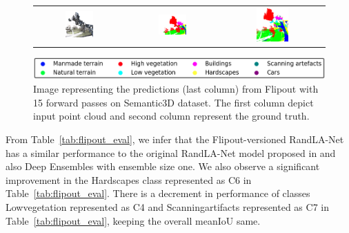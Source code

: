 \begin{figure}[h!]
\begin{tabular}{ccc}
            \includegraphics[width=0.33\textwidth, height=0.18\textheight]{images/seg_output/sem3d_seg_output/3_RGB.pdf} &
            \includegraphics[width=0.33\textwidth, height=0.18\textheight]{images/seg_output/sem3d_seg_output/3_GT.pdf}& 
            \includegraphics[width=0.33\textwidth, height=0.18\textheight]{images/seg_output/flipout/sem3d_3.pdf}\\
        \end{tabular}
        \includegraphics[scale=0.45]{images/legend.png}
        \caption{Image representing the predictions (last column) from Flipout with 15 forward passes on Semantic3D dataset.
        The first column depict input point cloud and second column represent the ground truth.}
        \label{fig:flipout_vis_sem3d}
    \end{figure}   

    From Table~\ref{tab:flipout_eval}, we infer that the Flipout-versioned RandLA-Net has a similar performance to the original RandLA-Net model proposed in \cite{Hu_2020_CVPR_Randla} and also Deep Ensembles with ensemble size one.
    We also observe a significant improvement in the Hardscapes class represented as C6 in Table~\ref{tab:flipout_eval}.
    There is a decrement in performance of classes Lowvegetation represented as C4 and Scanningartifacts represented as C7 in Table~\ref{tab:flipout_eval}, keeping the overall meanIoU same.
    
